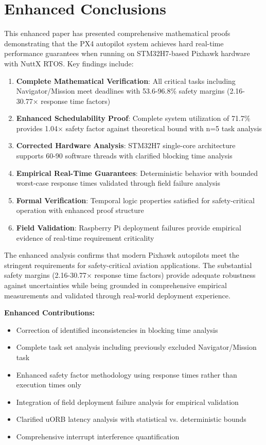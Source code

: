 \documentclass[11pt,a4paper]{article}
\theoremstyle{definition}
\theoremstyle{remark}
\begin{document}
\section{Enhanced Conclusions}

This enhanced paper has presented comprehensive mathematical proofs demonstrating that the PX4 autopilot system achieves hard real-time performance guarantees when running on STM32H7-based Pixhawk hardware with NuttX RTOS. Key findings include:

\begin{enumerate}
    \item \textbf{Complete Mathematical Verification}: All critical tasks including Navigator/Mission meet deadlines with 53.6-96.8\% safety margins (2.16-30.77× response time factors)
    \item \textbf{Enhanced Schedulability Proof}: Complete system utilization of 71.7\% provides 1.04× safety factor against theoretical bound with n=5 task analysis
    \item \textbf{Corrected Hardware Analysis}: STM32H7 single-core architecture supports 60-90 software threads with clarified blocking time analysis
    \item \textbf{Empirical Real-Time Guarantees}: Deterministic behavior with bounded worst-case response times validated through field failure analysis
    \item \textbf{Formal Verification}: Temporal logic properties satisfied for safety-critical operation with enhanced proof structure
    \item \textbf{Field Validation}: Raspberry Pi deployment failures provide empirical evidence of real-time requirement criticality
\end{enumerate}

The enhanced analysis confirms that modern Pixhawk autopilots meet the stringent requirements for safety-critical aviation applications. The substantial safety margins (2.16-30.77× response time factors) provide adequate robustness against uncertainties while being grounded in comprehensive empirical measurements and validated through real-world deployment experience.

\textbf{Enhanced Contributions:}
\begin{itemize}
\item Correction of identified inconsistencies in blocking time analysis
\item Complete task set analysis including previously excluded Navigator/Mission task
\item Enhanced safety factor methodology using response times rather than execution times only
\item Integration of field deployment failure analysis for empirical validation
\item Clarified uORB latency analysis with statistical vs. deterministic bounds
\item Comprehensive interrupt interference quantification
\end{itemize}
\end{document}
